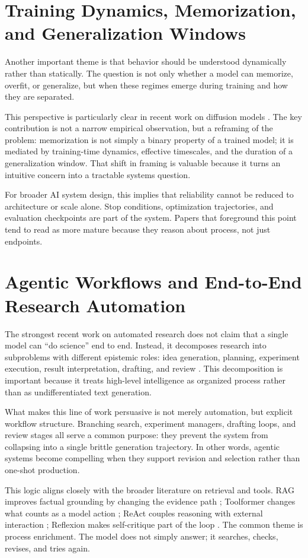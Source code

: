 \documentclass[10pt,twocolumn]{article}
\begin{document}
\section{Training Dynamics, Memorization, and Generalization Windows}
Another important theme is that behavior should be understood dynamically rather than statically. The question is not only whether a model can memorize, overfit, or generalize, but when these regimes emerge during training and how they are separated.

This perspective is particularly clear in recent work on diffusion models \citep{diffusion2025}. The key contribution is not a narrow empirical observation, but a reframing of the problem: memorization is not simply a binary property of a trained model; it is mediated by training-time dynamics, effective timescales, and the duration of a generalization window. That shift in framing is valuable because it turns an intuitive concern into a tractable systems question.

For broader AI system design, this implies that reliability cannot be reduced to architecture or scale alone. Stop conditions, optimization trajectories, and evaluation checkpoints are part of the system. Papers that foreground this point tend to read as more mature because they reason about process, not just endpoints.

\section{Agentic Workflows and End-to-End Research Automation}
The strongest recent work on automated research does not claim that a single model can ``do science'' end to end. Instead, it decomposes research into subproblems with different epistemic roles: idea generation, planning, experiment execution, result interpretation, drafting, and review \citep{aiscientist2024,aiscientistv2_2025}. This decomposition is important because it treats high-level intelligence as organized process rather than as undifferentiated text generation.

What makes this line of work persuasive is not merely automation, but explicit workflow structure. Branching search, experiment managers, drafting loops, and review stages all serve a common purpose: they prevent the system from collapsing into a single brittle generation trajectory. In other words, agentic systems become compelling when they support revision and selection rather than one-shot production.

This logic aligns closely with the broader literature on retrieval and tools. RAG improves factual grounding by changing the evidence path \citep{lewis2020rag}; Toolformer changes what counts as a model action \citep{schick2023toolformer}; ReAct couples reasoning with external interaction \citep{yao2023react}; Reflexion makes self-critique part of the loop \citep{shinn2023reflexion}. The common theme is process enrichment. The model does not simply answer; it searches, checks, revises, and tries again.
\end{document}
